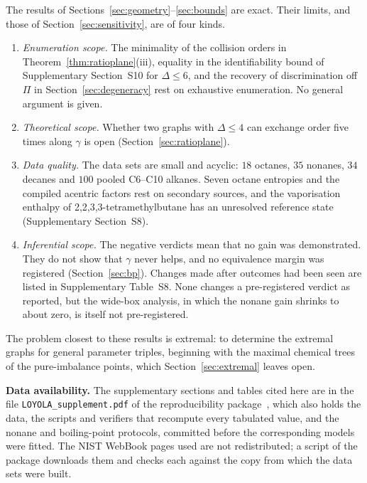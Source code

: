 \documentclass[a5paper, 10pt]{article}
\theoremstyle{plain}
\theoremstyle{remark}
\theoremstyle{definition}
\begin{document}
The results of Sections~\ref{sec:geometry}--\ref{sec:bounds} are exact.
Their limits, and those of Section~\ref{sec:sensitivity}, are of four
kinds.
\begin{enumerate}
\item[(i)] \emph{Enumeration scope.} The minimality of the collision orders in
Theorem~\ref{thm:ratioplane}(iii), equality in the identifiability
bound of Supplementary Section~S10 for $\Delta \le 6$, and the
recovery of discrimination off $\Pi$ in Section~\ref{sec:degeneracy}
rest on exhaustive enumeration. No general argument is given.
\item[(ii)] \emph{Theoretical scope.} Whether two graphs with $\Delta \le 4$ can exchange order
five times along $\gamma$ is open (Section~\ref{sec:ratioplane}).
\item[(iii)] \emph{Data quality.} The data sets are small and acyclic: $18$ octanes, $35$
nonanes, $34$ decanes and $100$ pooled C6--C10 alkanes. Seven octane
entropies and the compiled acentric factors rest on secondary sources,
and the vaporisation enthalpy of 2,2,3,3-tetramethylbutane has an
unresolved reference state (Supplementary Section~S8).
\item[(iv)] \emph{Inferential scope.} The negative verdicts mean that no
gain was demonstrated. They do not show that $\gamma$ never helps, and
no equivalence margin was registered (Section~\ref{sec:bp}). Changes made after outcomes had been seen are listed in
Supplementary Table~S8. None changes a pre-registered verdict as
reported, but the wide-box analysis, in which the nonane gain shrinks
to about zero, is itself not pre-registered.
\end{enumerate}

The problem closest to these results is extremal: to determine the
extremal graphs for general parameter triples, beginning with the
maximal chemical trees of the pure-imbalance points, which
Section~\ref{sec:extremal} leaves open.

\medskip
\noindent\textbf{Data availability.} The supplementary sections and
tables cited here are in the file \texttt{LOYOLA\_supplement.pdf} of the
reproducibility package~\cite{LoyolaRepo}, which also holds the data, the
scripts and verifiers that recompute every tabulated value, and the
nonane and boiling-point protocols, committed before the corresponding
models were fitted. The NIST WebBook pages used are not redistributed; a
script of the package downloads them and checks each against the copy
from which the data sets were built.
\end{document}
